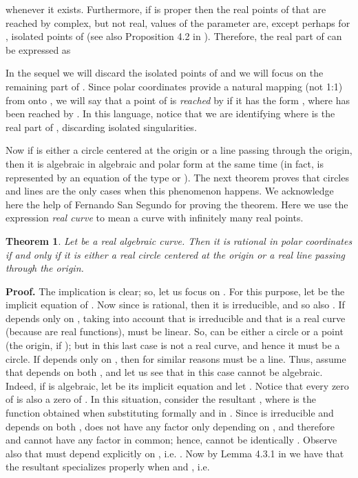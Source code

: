 \documentclass{elsart}
\newtheorem{theorem}{{\bf Theorem}}
\begin{document}
whenever it exists. Furthermore, if  is proper then the real points of  that are reached by complex, but not real, values of the
parameter are, except perhaps for , isolated points of  (see also Proposition 4.2 in \cite{Andradas}). Therefore, the
real part of  can be expressed as


In the sequel we will discard the isolated points of  and we will focus on the remaining part of . Since polar coordinates provide a natural mapping  (not 1:1) from  onto , we will say that a point of  is {\it reached} by  if it has the form , where  has been reached by . In this language, notice that we are identifying  where  is the real part of , discarding isolated singularities.

 Now if  is either a circle centered at the origin or a line passing through the origin, then it is algebraic in algebraic and polar form at the same time (in fact,  is represented by an equation of the type  or ). The next theorem proves that circles and lines are the only cases when this phenomenon happens. We acknowledge here the help of Fernando San Segundo for proving the theorem. Here we use the expression {\it real curve} to mean a curve with infinitely many real points.






\begin{theorem} \label{th-non-alg}  Let  be a real algebraic curve. Then it is rational in polar coordinates if and only if
it is either a real circle centered at the origin or a real line passing through the origin.
\end{theorem}

 {\bf Proof.}  The implication  is clear; so, let us focus on . For this purpose, let  be the implicit equation of . Now since  is rational, then it is irreducible, and so also . If  depends only on , taking into account that  is irreducible and that
  is a real curve (because  are real functions),  must be linear. So,  can be either a circle or a point (the origin, if ); but in this last case  is not a real curve, and hence it must be a circle. If  depends only on , then for similar reasons  must be a line. Thus, assume that  depends on both , and let us see that in this case  cannot be algebraic. Indeed, if  is algebraic, let  be its implicit equation and let . Notice that every zero of  is also a zero of .
In this situation, consider
the resultant , where  is the function obtained when substituting formally
 and  in .  Since  is irreducible and 
depends on both , does not have any factor only depending on , and therefore  and  cannot
have any factor in common; hence,  cannot be identically .
Observe also that  must depend explicitly on , i.e. . Now by Lemma 4.3.1 in \cite{Wi96} we have that the resultant  specializes properly when
 and , i.e.
\end{document}
